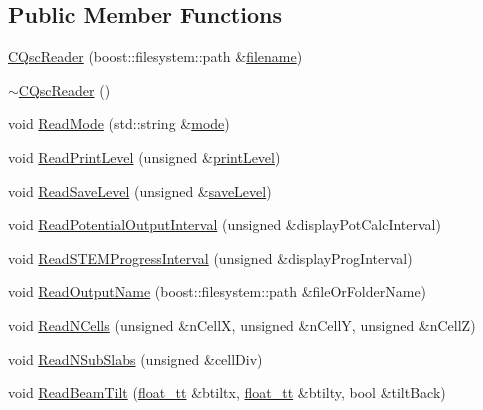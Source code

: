 \subsection*{Public Member Functions}
\begin{DoxyCompactItemize}
\item 
\hyperlink{class_q_s_t_e_m_1_1_c_qsc_reader_a3f8bb8f2633e30baf0559825f53e3282}{C\-Qsc\-Reader} (boost\-::filesystem\-::path \&\hyperlink{write_fields2_file_8m_af3723aa817dbb65282d5e1db81f08ad8}{filename})
\item 
\hyperlink{class_q_s_t_e_m_1_1_c_qsc_reader_a76c60285ba9f8c00ecc634a9fc574a96}{$\sim$\-C\-Qsc\-Reader} ()
\item 
void \hyperlink{class_q_s_t_e_m_1_1_c_qsc_reader_a8577ad2cc00a1e78c1f596d839877d7e}{Read\-Mode} (std\-::string \&\hyperlink{xyz2cfg_8m_aeb02c2817edf619fabdf1972b000db18}{mode})
\item 
void \hyperlink{class_q_s_t_e_m_1_1_c_qsc_reader_abbeb1c6e4c446c481859e1fa0db5dd40}{Read\-Print\-Level} (unsigned \&\hyperlink{qstem_8m_a24e096d96b8b76611e893ddd6c372ae5}{print\-Level})
\item 
void \hyperlink{class_q_s_t_e_m_1_1_c_qsc_reader_a046ae2b74b84d5ae531c0d72e2af1396}{Read\-Save\-Level} (unsigned \&\hyperlink{qstem_8m_a5a7a04041b8d36231b865f8c9b07cd40}{save\-Level})
\item 
void \hyperlink{class_q_s_t_e_m_1_1_c_qsc_reader_a6bbc839aabeaff43bdb9e7b40e72e38c}{Read\-Potential\-Output\-Interval} (unsigned \&display\-Pot\-Calc\-Interval)
\item 
void \hyperlink{class_q_s_t_e_m_1_1_c_qsc_reader_a91237125435a92e4d4aa7b6fd48ea5f8}{Read\-S\-T\-E\-M\-Progress\-Interval} (unsigned \&display\-Prog\-Interval)
\item 
void \hyperlink{class_q_s_t_e_m_1_1_c_qsc_reader_aff5065b07e5399b21b8233fd4b6c1e33}{Read\-Output\-Name} (boost\-::filesystem\-::path \&file\-Or\-Folder\-Name)
\item 
void \hyperlink{class_q_s_t_e_m_1_1_c_qsc_reader_a3a249959908506a26df9204e8d4f0ac5}{Read\-N\-Cells} (unsigned \&n\-Cell\-X, unsigned \&n\-Cell\-Y, unsigned \&n\-Cell\-Z)
\item 
void \hyperlink{class_q_s_t_e_m_1_1_c_qsc_reader_a84b7a0b7cbecd8fc0f986b95f76253ae}{Read\-N\-Sub\-Slabs} (unsigned \&cell\-Div)
\item 
void \hyperlink{class_q_s_t_e_m_1_1_c_qsc_reader_a1a34d1ac56dd007c22071912c8ab6b56}{Read\-Beam\-Tilt} (\hyperlink{namespace_q_s_t_e_m_a915d7caa497280d9f927c4ce8d330e47}{float\-\_\-tt} \&btiltx, \hyperlink{namespace_q_s_t_e_m_a915d7caa497280d9f927c4ce8d330e47}{float\-\_\-tt} \&btilty, bool \&tilt\-Back)

\end{DoxyCompactItemize}
